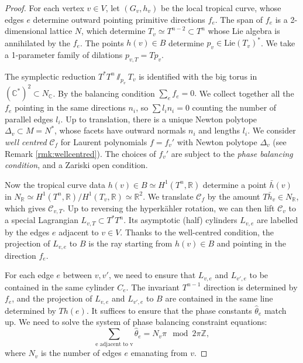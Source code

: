 \documentclass{article}
\theoremstyle{definition}
\newcommand{\R}{\mathbb{R}}
\newcommand{\C}{\mathbb{C}}
\newcommand{\Z}{\mathbb{Z}}
\begin{document}
	\begin{proof}
		For each vertex $v\in V$, let $(G_v,h_v) $ be the local tropical curve, whose edges $e$ determine outward pointing primitive directions $f_e$. The span of $f_e$ is a 2-dimensional lattice $N$, which determine $T_v\simeq T^{n-2}\subset T^n$ whose Lie algebra is annihilated by the $f_e$. The points $h(v)\in B$ determine $p_v\in \text{Lie}(T_v)^*$. We take a 1-parameter family of dilations $p_{v,T}=Tp_v$.
		
		
		
		The symplectic reduction $T^*T^n\sslash_{p_v} T_v$ is identified with the big torus in $(\C^*)^2\subset N_\C$.
		By  the balancing condition
		$
		\sum_e  f_e=0.
		$
		We collect together all the $f_e$ pointing in the same directions $n_i$, so $\sum l_i n_i=0$ counting the number of parallel edges $l_i$. Up to translation, there is a unique Newton polytope $\Delta_v \subset M= N^*$, whose facets have outward normals $n_i$ and lengths $l_i$.
		We consider \emph{well centred} $\mathcal{C}_f$ for Laurent polynomials $f=f_v'$ with Newton polytope $\Delta_v$ (see Remark \ref{rmk:wellcentred}). The choices of $f_v'$ are subject to the \emph{phase balancing condition}, and a Zariski open condition.
		
		
		
		Now the tropical curve data $h(v)\in B\simeq H^1(T^n, \R)$ determine a point $\bar{h}(v)$ in $N_\R\simeq H^1(T^n,\R)/H^1(T_v, \R)\simeq \R^2$. We  translate $\mathcal{C}_{f}$ by the amount $T\bar{h}_v\in N_\R$, which gives $\mathcal{C}_{v,T}$. Up to reversing the hyperk\"ahler rotation, we can then lift $\mathcal{C}_v$ to a special Lagrangian $L_{v,T}\subset T^*T^n$. Its asymptotic (half) cylinders $L_{v,e}$ are labelled by the edges $e$ adjacent to $v\in V$. Thanks to the well-centred condition, the projection of $L_{v,e}$ to $B$ is the ray starting from $h(v)\in B$ and pointing in the direction $f_e$. 
		
		
		For each edge $e$ between $v,v'$, we need to ensure that $L_{v,e}$ and $L_{v',e}$ to be contained in the same cylinder $C_e$. The invariant $T^{n-1}$ direction is determined by $f_e$, and the projection of $L_{v,e}$ and $L_{v',e}$ to $B$ are contained in the same line determined by $Th(e)$. It suffices to ensure that the phase constants $\hat{\theta}_e$ match up. We need to solve the system of phase balancing constraint equations:
		\begin{equation}\label{eqn: phasebalancing}
			\sum_{ \text{e adjacent to v}  } \hat{\theta}_e= N_v\pi \mod 2\pi\Z,
		\end{equation}
		where $N_v$ is the number of edges $e$ emanating from $v$. 
		

\end{proof}
\end{document}
